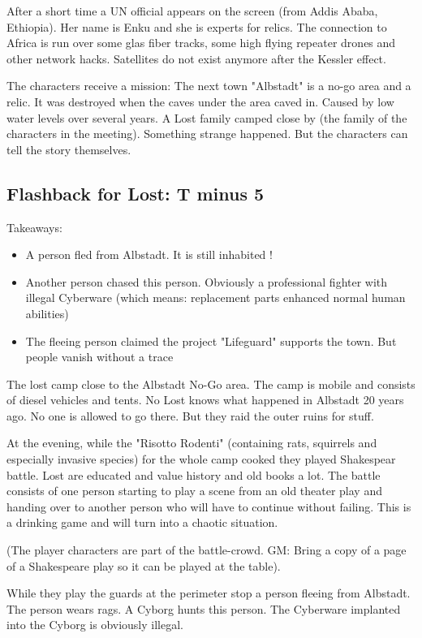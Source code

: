 After a short time a UN official appears on the screen (from Addis Ababa, Ethiopia). Her name is Enku and she is experts for relics.
The connection to Africa is run over some glas fiber tracks, some high flying repeater drones and other network hacks. Satellites do not exist anymore after the Kessler effect.

The characters receive a mission:
The next town "Albstadt" is a no-go area and a relic. It was destroyed when the caves under the area caved in. Caused by low water levels over several years. A Lost family camped close by (the family of the characters in the meeting). Something strange happened. But the characters can tell the story themselves.

\subsection{Flashback for Lost: T minus 5}

Takeaways:

\begin{itemize}
    \item A person fled from Albstadt. It is still inhabited !
    \item Another person chased this person. Obviously a professional fighter with illegal Cyberware (which means: replacement parts enhanced normal human abilities)
    \item The fleeing person claimed the project "Lifeguard" supports the town. But people vanish without a trace
\end{itemize}

The lost camp close to the Albstadt No-Go area. The camp is mobile and consists of diesel vehicles and tents. No Lost knows what happened in Albstadt 20 years ago. No one is allowed to go there. But they raid the outer ruins for stuff.

At the evening, while the "Risotto Rodenti" (containing rats, squirrels and especially invasive species) for the whole camp cooked they played Shakespear battle. Lost are educated and value history and old books a lot. The battle consists of one person starting to play a scene from an old theater play and handing over to another person who will have to continue without failing. This is a drinking game and will turn into a chaotic situation.

(The player characters are part of the battle-crowd. GM: Bring a copy of a page of a Shakespeare play so it can be played at the table).

While they play the guards at the perimeter stop a person fleeing from Albstadt. The person wears rags. A Cyborg hunts this person. The Cyberware implanted into the Cyborg is obviously illegal.

